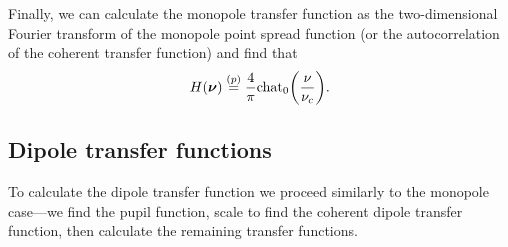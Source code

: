 \documentclass[]{osa-article}
\let\originalleft\left
\let\originalright\right
\renewcommand{\left}{\mathopen{}\mathclose\bgroup\originalleft}
\renewcommand{\right}{\aftergroup\egroup\originalright}
\providecommand{\bs}[1]{\boldsymbol{#1}}
\begin{document}
Finally, we can calculate the monopole transfer function as the two-dimensional Fourier transform of the monopole point spread function (or the autocorrelation
of the coherent transfer function) and find that 
\begin{align}
  H(\bs{\nu}) \stackrel{(p)}{=} \frac{4}{\pi}\text{chat}_0\left(\frac{\nu}{\nu_c}\right).
\end{align}

 \subsection{Dipole transfer functions}
 To calculate the dipole transfer function we proceed similarly to the monopole
 case---we find the pupil function, scale to find the coherent dipole transfer
 function, then calculate the remaining transfer functions.
 
\end{document}
